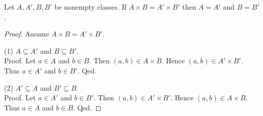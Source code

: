 \documentclass[10pt]{article}
\begin{document}
  \begin{forthel}
    \begin{proposition}[id=FOUNDATIONS_04_7456594440749056,printid]
      Let $A, A', B, B'$ be nonempty classes.
      If $A \times B = A' \times B'$ then $A = A'$ and $B = B'$.
    \end{proposition}
    \begin{proof}
      Assume $A \times B = A' \times B'$.

      (1) $A \subseteq A'$ and $B \subseteq B'$. \\
      Proof.
        Let $a \in A$ and $b \in B$.
        Then $(a,b) \in A \times B$.
        Hence $(a,b) \in A' \times B'$.
        Thus $a \in A'$ and $b \in B'$.
      Qed.

      (2) $A' \subseteq A$ and $B' \subseteq B$. \\
      Proof.
        Let $a \in A'$ and $b \in B'$.
        Then $(a,b) \in A' \times B'$.
        Hence $(a,b) \in A \times B$.
        Thus $a \in A$ and $b \in B$.
      Qed.
    \end{proof}
  \end{forthel}
\end{document}
